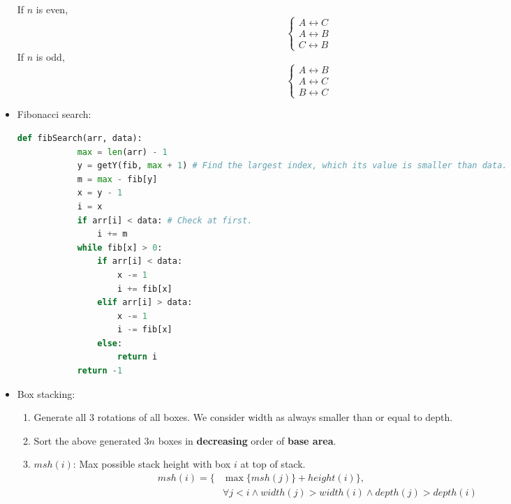 \begin{itemize}
    If $n$ is even, \begin{equation}
        \begin{cases}
            A \leftrightarrow C \\
            A \leftrightarrow B \\
            C \leftrightarrow B
        \end{cases} 
    \end{equation} If $n$ is odd, \begin{equation}
        \begin{cases}
            A \leftrightarrow B \\
            A \leftrightarrow C \\
            B \leftrightarrow C
        \end{cases} 
    \end{equation}
    \item Fibonacci search: \begin{lstlisting}[caption={Fibonacci search.}, captionpos=b, language=Python]
        def fibSearch(arr, data):
            max = len(arr) - 1
            y = getY(fib, max + 1) # Find the largest index, which its value is smaller than data.
            m = max - fib[y] 
            x = y - 1
            i = x
            if arr[i] < data: # Check at first.
                i += m
            while fib[x] > 0:
                if arr[i] < data:
                    x -= 1
                    i += fib[x]
                elif arr[i] > data:
                    x -= 1
                    i -= fib[x]
                else:
                    return i
            return -1
    \end{lstlisting}
    \item Box stacking: \begin{enumerate}
        \item Generate all $3$ rotations of all boxes. We consider width as always smaller than or equal to depth.
        \item Sort the above generated $3n$ boxes in \textbf{decreasing} order of \textbf{base area}.
        \item $msh(i)$: Max possible stack height with box $i$ at top of stack. \begin{equation}
            \begin{aligned}
                msh(i) = \{& \max \{msh(j)\} + height(i)\}, \\ 
                & \forall j < i \land width(j) > width(i) \land depth(j) > depth(i)
            \end{aligned}

\end{equation}
\end{enumerate}
\end{itemize}
